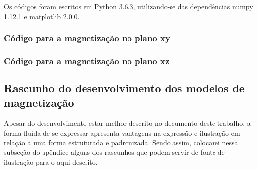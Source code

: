\documentclass[a4paper, 12pt, twocolumn]{article}
\begin{document}
Os códigos foram escritos em Python 3.6.3, utilizando-se das dependências numpy 1.12.1 e matplotlib 2.0.0. 

\subsubsection{Código para a magnetização no plano xy}


\subsubsection{Código para a magnetização no plano xz}


\subsection{Rascunho do desenvolvimento dos modelos de magnetização}

Apesar do desenvolvimento estar melhor descrito no documento deste trabalho, a forma fluída de se expressar apresenta vantagens na expressão e ilustração em relação a uma forma estruturada e padronizada. Sendo assim, colocarei nessa subseção do apêndice alguns dos rascunhos que podem servir de fonte de ilustração para o aqui descrito.
\end{document}

